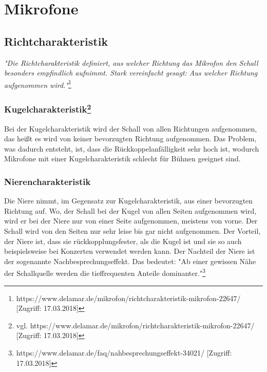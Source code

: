 \section{Mikrofone}
\subsection{Richtcharakteristik}
\textit{"Die Richtcharakteristik definiert, aus welcher Richtung das Mikrofon den Schall besonders empfindlich aufnimmt. Stark vereinfacht gesagt: Aus welcher Richtung aufgenommen wird."}\footnote{\label{}https://www.delamar.de/mikrofon/richtcharakteristik-mikrofon-22647/ [Zugriff: 17.03.2018]} 
\subsubsection[Kugelcharakteristik]{Kugelcharakteristik\protect\footnote{\label{}vgl. https://www.delamar.de/mikrofon/richtcharakteristik-mikrofon-22647/ [Zugriff: 17.03.2018]}}
Bei der Kugelcharakteristik wird der Schall von allen Richtungen aufgenommen, das heißt es wird von keiner bevorzugten Richtung aufgenommen. Das Problem, was dadurch entsteht, ist, dass die Rückkoppelanfälligkeit sehr hoch ist, wodurch Mikrofone mit einer Kugelcharakteristik schlecht für Bühnen geeignet sind. 
\subsubsection{Nierencharakteristik}
Die Niere nimmt, im Gegensatz zur Kugelcharakteristik, aus einer bevorzugten Richtung auf. Wo, der Schall bei der Kugel von allen Seiten aufgenommen wird, wird er bei der Niere nur von einer Seite aufgenommen, meistens von vorne. Der Schall wird von den Seiten nur sehr leise bis gar nicht aufgenommen. Der Vorteil, der Niere ist, dass sie rückkopplungsfester, als die Kugel ist und sie so auch beispielsweise bei Konzerten verwendet werden kann. Der Nachteil der Niere ist der sogenannte Nachbesprechungseffekt. Das bedeutet: "Ab einer gewissen Nähe der Schallquelle werden die tieffrequenten Anteile dominanter."\footnote{\label{}https://www.delamar.de/faq/nahbesprechungseffekt-34021/ [Zugriff: 17.03.2018]}
